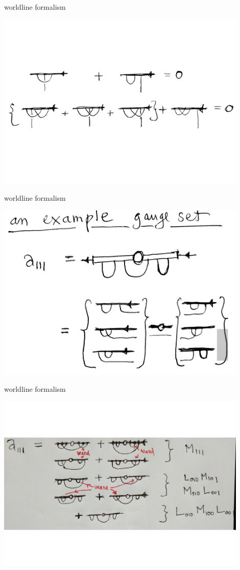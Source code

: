 \begin{frame}{worldline formalism}
\begin{center}
\includegraphics[width=0.90\textwidth]{WardIds}
\end{center}
\end{frame}
\begin{frame}{worldline formalism}
\begin{center}
\includegraphics[width=0.90\textwidth]{a111a}
\end{center}
\end{frame}
\begin{frame}{worldline formalism}
\begin{center}
\includegraphics[width=0.90\textwidth]{a111b}
\end{center}
\end{frame}




